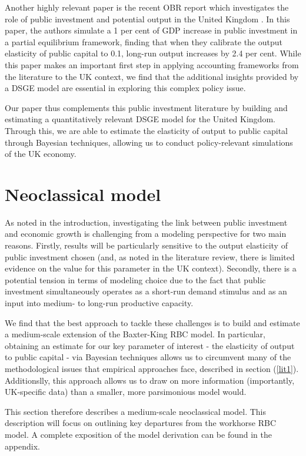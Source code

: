 \documentclass[titlepage, 11pt, a4paper]{article}
\renewcommand{\&}{and}
\begin{document}
Another highly relevant paper is the recent OBR report which investigates the role of public investment and potential output in the United Kingdom \citep{Suresh24}. In this paper, the authors simulate a 1 per cent of GDP increase in public investment in a partial equilibrium framework, finding that when they calibrate the output elasticity of public capital to 0.1, long-run output increases by 2.4 per cent. 
While this paper makes an important first step in applying accounting frameworks from the literature to the UK context, we find that the additional insights provided by a DSGE model are essential in exploring this complex policy issue.

Our paper thus complements this public investment literature by building and estimating a quantitatively relevant DSGE model for the United Kingdom. Through this, we are able to estimate the elasticity of output to public capital through Bayesian techniques, allowing us to conduct policy-relevant simulations of the UK economy. 



\section{Neoclassical model} \label{section3}

As noted in the introduction, investigating the link between public investment and economic growth is challenging from a modeling perspective for two main reasons. Firstly, results will be particularly sensitive to the output elasticity of public investment chosen (and, as noted in the literature review, there is limited evidence on the value for this parameter in the UK context). Secondly, there is a potential tension in terms of modeling choice due to the fact that public investment simultaneously operates as a short-run demand stimulus and as an input into medium- to long-run productive capacity. 

We find that the best approach to tackle these challenges is to build and estimate a medium-scale extension of the Baxter-King RBC model.
In particular, obtaining an estimate for our key parameter of interest - the elasticity of output to public capital - via Bayesian techniques allows us to circumvent many of the methodological issues that empirical approaches face, described in section (\ref{lit1}).
Additionslly, this approach allows us to draw on more information (importantly, UK-specific data) than a smaller, more parsimonious model would.


This section therefore describes a medium-scale neoclassical model. This description will focus on outlining key departures from the workhorse RBC model. A complete exposition of the model derivation can be found in the appendix. 
\end{document}
